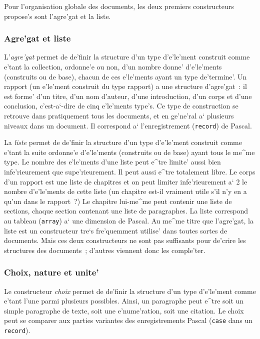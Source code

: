 Pour l'organisation globale des documents, les deux premiers constructeurs
propose's sont l'agre'gat et la liste.

\subsubsection{Agre'gat et liste}

L'{\em agre'gat} permet de de'finir la structure d'un type d'e'le'ment
construit comme e'tant la collection, ordonne'e ou non, d'un nombre donne'
d'e'le'ments (construits ou de base), chacun de ces e'le'ments ayant un type
de'termine'.
Un rapport (un e'le'ment construit du type rapport) a une structure
d'agre'gat~: il est forme' d'un titre, d'un nom d'auteur, d'une introduction,
d'un corps et d'une conclusion, c'est-a`-dire de cinq e'le'ments type's.
Ce type de construction se retrouve dans pratiquement tous les documents,
et en ge'ne'ral a` plusieurs niveaux dans un document. 
Il correspond a` l'enregistrement ({\tt record}) de Pascal.

La {\em liste} permet de de'finir la structure d'un type d'e'le'ment construit
comme e'tant la suite ordonne'e d'e'le'ments (construits ou de base) ayant tous
le me^me type. Le nombre des e'le'ments d'une liste peut e^tre limite' aussi
bien infe'rieurement que supe'rieurement. Il peut aussi e^tre totalement
libre. Le corps d'un rapport est une liste de chapitres et on peut limiter
infe'rieurement a` 2 le nombre d'e'le'ments de cette liste (un chapitre est-il
vraiment utile s'il n'y en a qu'un dans le rapport~?) Le chapitre
lui-me^me peut contenir une liste de sections, chaque section contenant
une liste de paragraphes.
La liste correspond au tableau ({\tt array}) a` une dimension de Pascal.
Au me^me titre que l'agre'gat, la liste est un
constructeur tre`s fre'quemment utilise' dans toutes sortes de documents.
Mais ces deux constructeurs ne sont pas suffisants pour de'crire les
structures des documents~; d'autres viennent donc les comple'ter.

\subsubsection{Choix, nature et unite'}

Le constructeur {\em choix} permet de de'finir la structure d'un type
d'e'le'ment comme e'tant l'une parmi plusieurs possibles. Ainsi, un paragraphe
peut e^tre soit un simple paragraphe de texte, soit une e'nume'ration, soit
une citation. Le choix peut se comparer aux parties variantes des
enregistrements Pascal ({\tt case} dans un {\tt record}).

